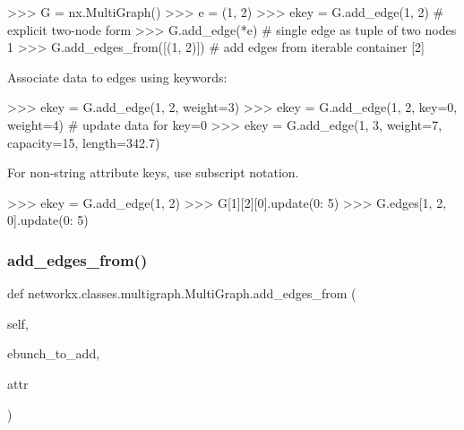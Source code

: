\begin{DoxyVerb}
>>> G = nx.MultiGraph()
>>> e = (1, 2)
>>> ekey = G.add_edge(1, 2)  # explicit two-node form
>>> G.add_edge(*e)  # single edge as tuple of two nodes
1
>>> G.add_edges_from([(1, 2)])  # add edges from iterable container
[2]

Associate data to edges using keywords:

>>> ekey = G.add_edge(1, 2, weight=3)
>>> ekey = G.add_edge(1, 2, key=0, weight=4)  # update data for key=0
>>> ekey = G.add_edge(1, 3, weight=7, capacity=15, length=342.7)

For non-string attribute keys, use subscript notation.

>>> ekey = G.add_edge(1, 2)
>>> G[1][2][0].update({0: 5})
>>> G.edges[1, 2, 0].update({0: 5})
\end{DoxyVerb}
 \mbox{\label{classnetworkx_1_1classes_1_1multigraph_1_1MultiGraph_a0b46c8a0ec80143a93fffa594c6985f1}} 
\subsubsection{\texorpdfstring{add\+\_\+edges\+\_\+from()}{add\_edges\_from()}}
{\footnotesize\ttfamily def networkx.\+classes.\+multigraph.\+Multi\+Graph.\+add\+\_\+edges\+\_\+from (\begin{DoxyParamCaption}\item[{}]{self,  }\item[{}]{ebunch\+\_\+to\+\_\+add,  }\item[{}]{attr }\end{DoxyParamCaption})}

